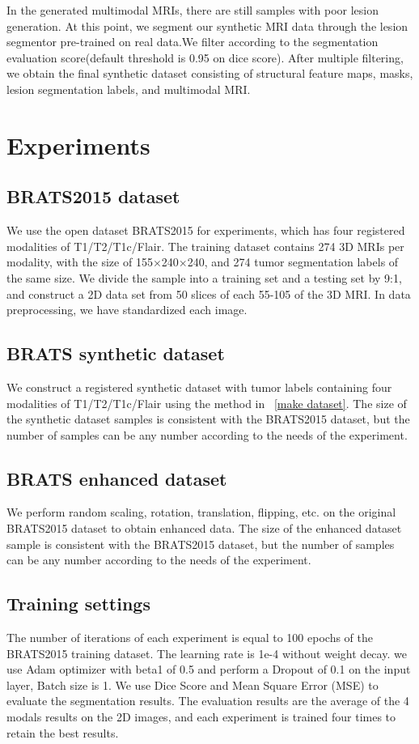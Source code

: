 \documentclass[letterpaper]{article} %
\begin{document}
In the generated multimodal MRIs, there are still samples with poor lesion generation. At this point, we segment our synthetic MRI data through the lesion segmentor pre-trained on real data.We filter according to the segmentation evaluation score(default threshold is 0.95 on dice score). After multiple filtering, we obtain the final synthetic dataset consisting of structural feature maps, masks,  lesion segmentation labels, and multimodal MRI.

\section{Experiments}

\subsection{BRATS2015 dataset}
We use the open dataset BRATS2015\cite{91menze:hal-00935640} for experiments, which has four registered modalities of T1/T2/T1c/Flair. The training dataset contains 274 3D MRIs per modality, with the size of 155$\times$240$\times$240, and 274 tumor segmentation labels of the same size. We divide the sample into a training set and a testing set by 9:1, and construct a 2D data set from 50 slices of each 55-105 of the 3D MRI. In data preprocessing, we have standardized each image.

\subsection{BRATS synthetic dataset}
We construct a registered synthetic dataset with tumor labels containing four modalities of T1/T2/T1c/Flair using the method in ~\ref{make dataset}. The size of the synthetic dataset samples is consistent with the BRATS2015 dataset, but the number of samples can be any number according to the needs of the experiment.

\subsection{BRATS enhanced dataset}
We perform random scaling, rotation, translation, flipping, etc. on the original BRATS2015 dataset to obtain enhanced data. The size of the enhanced dataset sample is consistent with the BRATS2015 dataset, but the number of samples can be any number according to the needs of the experiment.

\subsection{Training settings}
The number of iterations of each experiment is equal to 100 epochs of the BRATS2015 training dataset. The learning rate is 1e-4 without weight decay.  we use Adam optimizer with beta1 of 0.5 and perform a Dropout of 0.1 on the input layer, Batch size is 1. We use Dice Score \cite{95dice1945measures} and Mean Square Error (MSE)\cite{94prasad1990the} to evaluate the segmentation results. The evaluation results are the average of the 4 modals results on the 2D images, and each experiment is trained four times to retain the best results.
\end{document}
